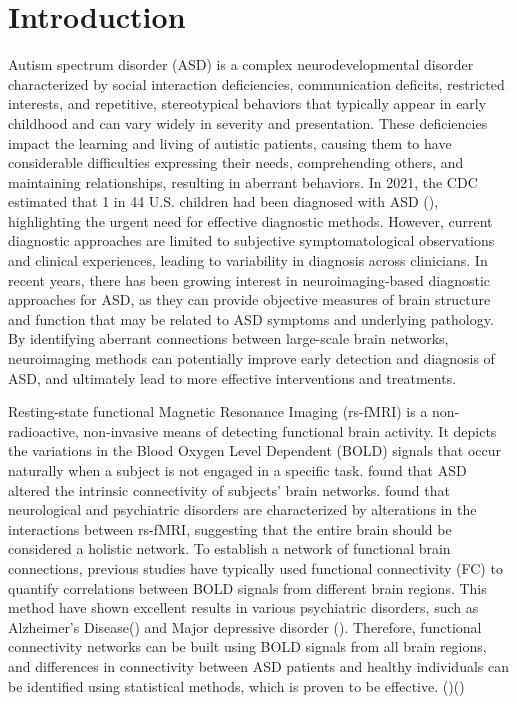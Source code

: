 \documentclass[a4paper]{cas-dc}
\begin{document}
\section{Introduction}\label{Introduction}
Autism spectrum disorder (ASD) is a complex neurodevelopmental disorder characterized by social interaction deficiencies, communication deficits, restricted interests, and repetitive, stereotypical behaviors that typically appear in early childhood and can vary widely in severity and presentation. These deficiencies impact the learning and living of autistic patients, causing them to have considerable difficulties expressing their needs, comprehending others, and maintaining relationships, resulting in aberrant behaviors. In 2021, the CDC estimated that 1 in 44 U.S. children had been diagnosed with ASD (\cite{maenner2021prevalence}), highlighting the urgent need for effective diagnostic methods. However, current diagnostic approaches are limited to subjective symptomatological observations and clinical experiences, leading to variability in diagnosis across clinicians. In recent years, there has been growing interest in neuroimaging-based diagnostic approaches for ASD, as they can provide objective measures of brain structure and function that may be related to ASD symptoms and underlying pathology. By identifying aberrant connections between large-scale brain networks, neuroimaging methods can potentially improve early detection and diagnosis of ASD, and ultimately lead to more effective interventions and treatments.

Resting-state functional Magnetic Resonance Imaging (rs-fMRI) is a non-radioactive, non-invasive means of detecting functional brain activity. It depicts the variations in the Blood Oxygen Level Dependent (BOLD) signals that occur naturally when a subject is not engaged in a specific task. \cite{monk2009abnormalities} found that ASD altered the intrinsic connectivity of subjects' brain networks. \cite{woodward2015resting} found that neurological and psychiatric disorders are characterized by alterations in the interactions between rs-fMRI, suggesting that the entire brain should be considered a holistic network. To establish a network of functional brain connections, previous studies have typically used functional connectivity (FC) to quantify correlations between BOLD signals from different brain regions. This method have shown excellent results in various psychiatric disorders, such as Alzheimer's Disease(\cite{ju2017early}) and Major depressive disorder (\cite{zeng2012identifying}). Therefore, functional connectivity networks can be built using BOLD signals from all brain regions, and differences in connectivity between ASD patients and healthy individuals can be identified using statistical methods, which is proven to be effective. (\cite{woodward2015resting})(\cite{assaf2010abnormal})
\end{document}
